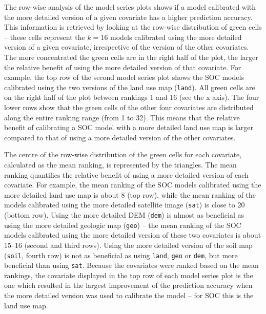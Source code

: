 The row-wise analysis of the model series plots shows if a model calibrated with the more detailed version of 
a given covariate has a higher prediction accuracy. This information is retrieved by looking at the row-wise 
distribution of green cells -- these cells represent the $k = 16$ models calibrated using the more detailed 
version of a given covariate, irrespective of the version of the other covariates. The more concentrated the 
green cells are in the right half of the plot, the larger the relative benefit of using the more detailed 
version of that covariate. For example, the top row of the second model series plot shows the SOC models 
calibrated using the two versions of the land use map (\texttt{land}). All green cells are on the right half 
of the plot between rankings \num{1} and \num{16} (see the x axis). The four lower rows show that the green 
cells of the other four covariates are distributed along the entire ranking range (from \num{1} to \num{32}). 
This means that the relative benefit of calibrating a SOC model with a more detailed land use map is larger 
compared to that of using a more detailed version of the other covariates.

The centre of the row-wise distribution of the green cells for each covariate, calculated as the mean ranking, 
is represented by the triangles. The mean ranking quantifies the relative benefit of using a more detailed 
version of each covariate. For example, the mean ranking of the SOC models calibrated using the more detailed 
land use map is about \num{8} (top row), while the mean ranking of the models calibrated using the more 
detailed satellite image (\texttt{sat}) is close to \num{20} (bottom row). Using the more detailed DEM 
(\texttt{dem}) is almost as beneficial as using the more detailed geologic map (\texttt{geo}) -- the mean 
ranking of the SOC models calibrated using the more detailed version of these two covariates is about 
\num{15}--\num{16} (second and third rows). Using the more detailed version of the soil map (\texttt{soil}, 
fourth row) is not as beneficial as using \texttt{land}, \texttt{geo} or \texttt{dem}, but more beneficial 
than using \texttt{sat}. Because the covariates were ranked based on the mean rankings, the covariate 
displayed in the top row of each model series plot is the one which resulted in the largest improvement of the 
prediction accuracy when the more detailed version was used to calibrate the model -- for SOC this is the land 
use map.

